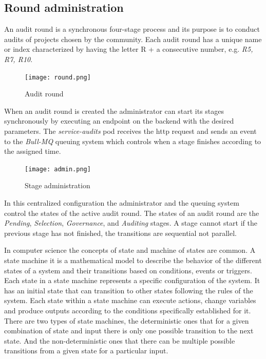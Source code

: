 \documentclass[9pt]{article}
\begin{document}
\subsection { Round administration }

An audit round is a synchronous four-stage process and its purpose is to conduct audits of projects chosen by the community. Each audit round has a unique name or index characterized by having the letter R + a consecutive number, e.g. \emph{R5, R7, R10}. 

\begin{figure}[ht]
  \centering
  \texttt{[image: round.png]}
  \caption{Audit round}
  \label{fig:mi_imagen}
\end{figure}

When an audit round is created the administrator can start its stages synchronously by executing an endpoint on the backend with the desired parameters. The \emph{service-audits} pod receives the http request and sends an event to the \emph{Bull-MQ} queuing system which controls when a stage finishes according to the assigned time.

\begin{figure}[ht]
  \centering
  \texttt{[image: admin.png]}
  \caption{Stage administration}
  \label{fig:mi_imagen}
\end{figure}

In this centralized configuration the administrator and the queuing system control the states of the active audit round. The states of an audit round are the \emph{Pending}, \emph{Selection}, \emph{Governance}, and \emph{Auditing} stages. A stage cannot start if the previous stage has not finished, the transitions are sequential not parallel.

In computer science the concepts of state and machine of states are common. A state machine it is a mathematical model to describe the behavior of the different states of a system and their transitions based on conditions, events or triggers. Each state in a state machine represents a specific configuration of the system. It has an initial state that can transition to other states following the rules of the system. Each state within a state machine can execute actions, change variables and produce outputs according to the conditions specifically established for it. There are two types of state machines, the deterministic ones that for a given combination of state and input there is only one possible transition to the next state. And the non-deterministic ones that there can be multiple possible transitions from a given state for a particular input.
\end{document}
